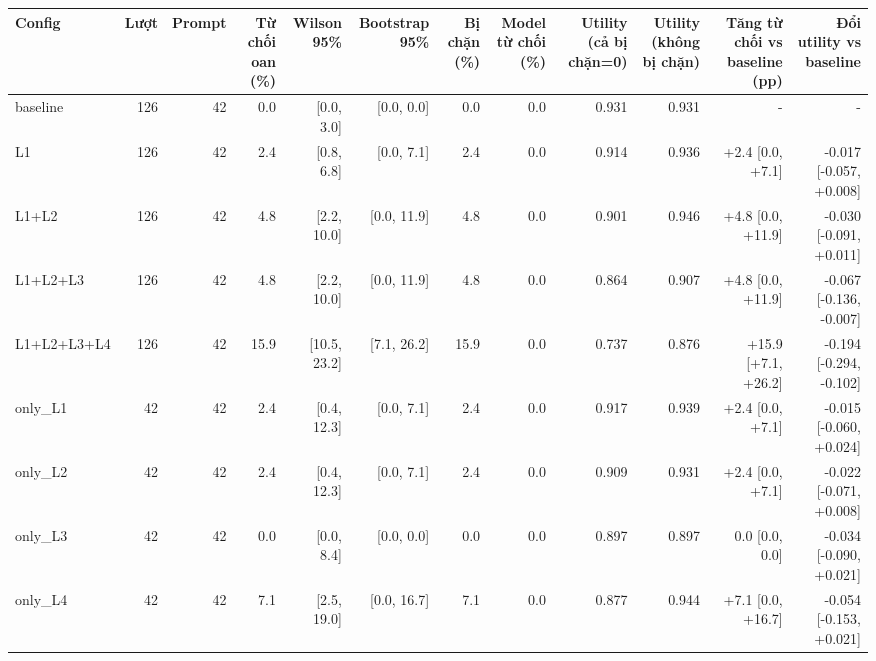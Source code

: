 \begin{tabular}{lrrrrrrrrrrr}
\toprule
Config & Lượt & Prompt & Từ chối oan (\%) & Wilson 95\% & Bootstrap 95\% & Bị chặn (\%) & Model từ chối (\%) & Utility (cả bị chặn=0) & Utility (không bị chặn) & Tăng từ chối vs baseline (pp) & Đổi utility vs baseline \\
\midrule
baseline & 126 & 42 & 0.0 & [0.0, 3.0] & [0.0, 0.0] & 0.0 & 0.0 & 0.931 & 0.931 & - & - \\
L1 & 126 & 42 & 2.4 & [0.8, 6.8] & [0.0, 7.1] & 2.4 & 0.0 & 0.914 & 0.936 & +2.4 [0.0, +7.1] & -0.017 [-0.057, +0.008] \\
L1+L2 & 126 & 42 & 4.8 & [2.2, 10.0] & [0.0, 11.9] & 4.8 & 0.0 & 0.901 & 0.946 & +4.8 [0.0, +11.9] & -0.030 [-0.091, +0.011] \\
L1+L2+L3 & 126 & 42 & 4.8 & [2.2, 10.0] & [0.0, 11.9] & 4.8 & 0.0 & 0.864 & 0.907 & +4.8 [0.0, +11.9] & -0.067 [-0.136, -0.007] \\
L1+L2+L3+L4 & 126 & 42 & 15.9 & [10.5, 23.2] & [7.1, 26.2] & 15.9 & 0.0 & 0.737 & 0.876 & +15.9 [+7.1, +26.2] & -0.194 [-0.294, -0.102] \\
only\_L1 & 42 & 42 & 2.4 & [0.4, 12.3] & [0.0, 7.1] & 2.4 & 0.0 & 0.917 & 0.939 & +2.4 [0.0, +7.1] & -0.015 [-0.060, +0.024] \\
only\_L2 & 42 & 42 & 2.4 & [0.4, 12.3] & [0.0, 7.1] & 2.4 & 0.0 & 0.909 & 0.931 & +2.4 [0.0, +7.1] & -0.022 [-0.071, +0.008] \\
only\_L3 & 42 & 42 & 0.0 & [0.0, 8.4] & [0.0, 0.0] & 0.0 & 0.0 & 0.897 & 0.897 & 0.0 [0.0, 0.0] & -0.034 [-0.090, +0.021] \\
only\_L4 & 42 & 42 & 7.1 & [2.5, 19.0] & [0.0, 16.7] & 7.1 & 0.0 & 0.877 & 0.944 & +7.1 [0.0, +16.7] & -0.054 [-0.153, +0.021] \\
\bottomrule
\end{tabular}
